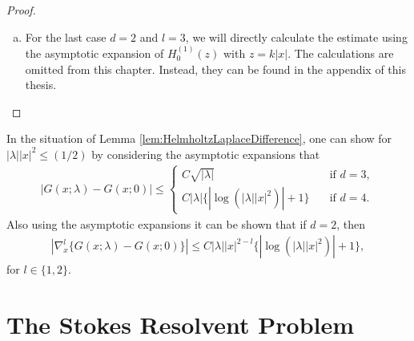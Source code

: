 \begin{proof}
\begin{enumerate}[(a)]
  \item For the last case $d = 2$ and $l = 3$, we will directly calculate the estimate using the asymptotic expansion of $H_0^{(1)}(z)$ with $z = k|x|$. The calculations are omitted from this chapter. Instead, they can be found in the appendix of this thesis. \qedhere
%
  \end{enumerate} 
\end{proof}

\begin{rem}
  \label{rem:HelmholtzLaplaceDifference}
  In the situation of Lemma \ref{lem:HelmholtzLaplaceDifference}, one can show for $|\lambda| |x|^2 \leq (1/2)$ by considering the asymptotic expansions that 
  \begin{align*}
    |G(x; \lambda) - G(x; 0) | \leq \begin{cases}
      C \sqrt{|\lambda|} \quad&\text{if } d = 3, \\
      C |\lambda| \{ |\log(|\lambda| |x|^2) | + 1 \} \quad&\text{if } d = 4.
    \end{cases}
  \end{align*}
  Also using the asymptotic expansions it can be shown that if $d = 2$, then
  \begin{align*}
    |\nabla_x^l \{ G(x; \lambda) - G(x; 0) \} | \leq C |\lambda| |x|^{2 - l} \{ |\log(|\lambda| |x|^2 ) | + 1 \},
  \end{align*}
  for $l \in \{1, 2\}$.  
\end{rem}

\section{The Stokes Resolvent Problem}
\label{sec:2.2}


